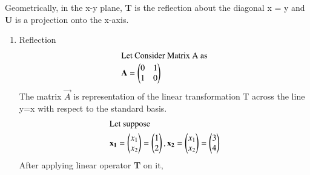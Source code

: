 Geometrically, in the x-y plane, \textbf{T} is the reflection about the diagonal x = y and \textbf{U} is a projection onto the x-axis.\\ 
\begin{enumerate}
	\item Reflection
\begin{align}
\intertext{Let Consider Matrix A as} \mathbf{A} = \begin{pmatrix}0 & 1 \\ 1 & 0 \end{pmatrix} 
\end{align}
The matrix  $\vec{A}$ is representation  of the linear transformation T across the line y=x with respect to the standard basis.
\begin{align}
\intertext{Let suppose}\mathbf{x_1} =\begin{pmatrix}x_1 \\ x_2\end{pmatrix} = \begin{pmatrix}1 \\ 2\end{pmatrix},\mathbf{x_2} =\begin{pmatrix}x_1 \\ x_2\end{pmatrix} =\begin{pmatrix}3 \\ 4\end{pmatrix} 
\end{align}
After applying linear operator \textbf{T} on it,


\end{enumerate}
